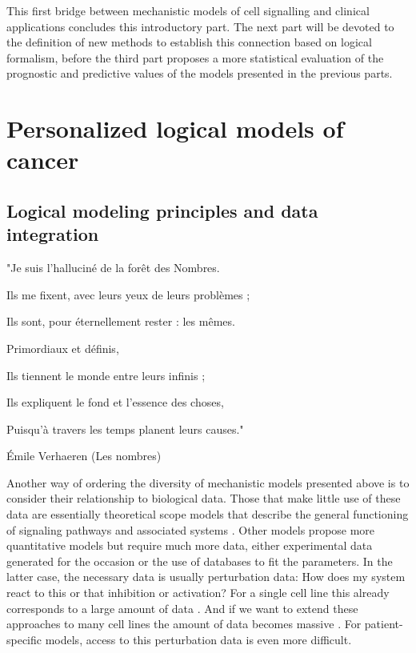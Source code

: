 \documentclass[a4paper,12pt,twoside,onecolumn,openright,final,oldfontcommands]{memoir}
\newcommand{\initial}[1]{
	\lettrine[lines=3,lhang=0.33,nindent=0em]{
		\color{gray}
     		{\textsc{#1}}}{}}
\begin{document}
This first bridge between mechanistic models of cell signalling and
clinical applications concludes this introductory part. The next part
will be devoted to the definition of new methods to establish this
connection based on logical formalism, before the third part proposes a
more statistical evaluation of the prognostic and predictive values of
the models presented in the previous parts.

\part{Personalized logical models of
cancer}\label{part-personalized-logical-models-of-cancer}

\chapter{Logical modeling principles and data
integration}\label{logical-modeling-principles-and-data-integration}

\epigraph{"Je suis l’halluciné de la forêt des Nombres.

Ils me fixent, avec leurs yeux de leurs problèmes ;

Ils sont, pour éternellement rester : les mêmes.

Primordiaux et définis,

Ils tiennent le monde entre leurs infinis ;

Ils expliquent le fond et l’essence des choses,

Puisqu’à travers les temps planent leurs causes."}{Émile Verhaeren (Les nombres)}

\initial{A}nother way of ordering the diversity of mechanistic models
presented above is to consider their relationship to biological data.
Those that make little use of these data are essentially theoretical
scope models that describe the general functioning of signaling pathways
and associated systems \citep{calzone2010mathematical}. Other models
propose more quantitative models but require much more data, either
experimental data generated for the occasion or the use of databases to
fit the parameters. In the latter case, the necessary data is usually
perturbation data: How does my system react to this or that inhibition
or activation? For a single cell line this already corresponds to a
large amount of data \citep{razzaq2018computational}. And if we want to
extend these approaches to many cell lines the amount of data becomes
massive \citep{frohlich2018efficient}. For patient-specific models,
access to this perturbation data is even more difficult.
\end{document}

